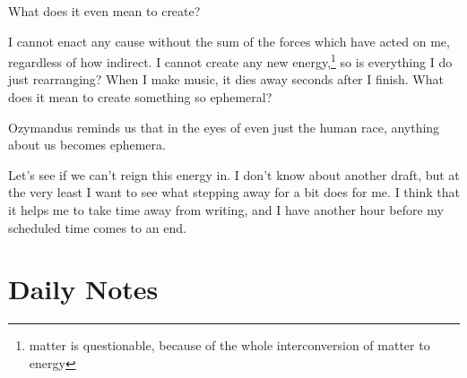 \documentclass[12pt]{article}
\renewcommand{\,}{\textsuperscript{,}}
\begin{document}
What does it even mean to create?

I cannot enact any cause without the sum of the forces which have acted on me, regardless of how indirect.  
I cannot create any new energy,\footnote{matter is questionable, because of the whole interconversion of matter to energy} so is everything I do just rearranging?  
When I make music, it dies away seconds after I finish.  
What does it mean to create something so ephemeral?

Ozymandus reminds us that in the eyes of even just the human race, anything about us becomes ephemera.

Let's see if we can't reign this energy in.  
I don't know about another draft, but at the very least I want to see what stepping away for a bit does for me.  
I think that it helps me to take time away from writing, and I have another hour before my scheduled time comes to an end.

\section{Daily Notes}
\end{document}
